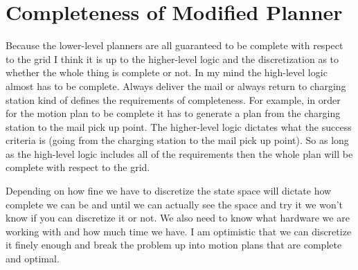 \documentclass{article}
\begin{document}
\section{Completeness of Modified Planner}

Because the lower-level planners are all guaranteed to be complete with respect to the grid I think it is up to the higher-level logic and the discretization as to whether the whole thing is complete or not.
In my mind the high-level logic almost has to be complete.
Always deliver the mail or always return to charging station kind of defines the requirements of completeness.
For example, in order for the motion plan to be complete it has to generate a plan from the charging station to the mail pick up point.
The higher-level logic dictates what the success criteria is (going from the charging station to the mail pick up point).
So as long as the high-level logic includes all of the requirements then the whole plan will be complete with respect to the grid.

Depending on how fine we have to discretize the state space will dictate how complete we can be and until we can actually see the space and try it we won't know if you can discretize it or not.
We also need to know what hardware we are working with and how much time we have.
I am optimistic that we can discretize it finely enough and break the problem up into motion plans that are complete and optimal.
\end{document}
